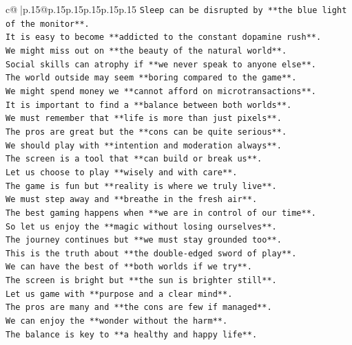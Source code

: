 \documentclass{article}
\begin{document}
{\begin{supertabular}{c@{$\;$}|p{.15\linewidth}@{}p{.15\linewidth}p{.15\linewidth}p{.15\linewidth}p{.15\linewidth}p{.15\linewidth}}
{{{\texttt{Sleep can be disrupted by **the blue light of the monitor**.} \\
\texttt{It is easy to become **addicted to the constant dopamine rush**.} \\
\texttt{We might miss out on **the beauty of the natural world**.} \\
\texttt{Social skills can atrophy if **we never speak to anyone else**.} \\
\texttt{The world outside may seem **boring compared to the game**.} \\
\texttt{We might spend money we **cannot afford on microtransactions**.} \\
\texttt{It is important to find a **balance between both worlds**.} \\
\texttt{We must remember that **life is more than just pixels**.} \\
\texttt{The pros are great but the **cons can be quite serious**.} \\
\texttt{We should play with **intention and moderation always**.} \\
\texttt{The screen is a tool that **can build or break us**.} \\
\texttt{Let us choose to play **wisely and with care**.} \\
\texttt{The game is fun but **reality is where we truly live**.} \\
\texttt{We must step away and **breathe in the fresh air**.} \\
\texttt{The best gaming happens when **we are in control of our time**.} \\
\texttt{So let us enjoy the **magic without losing ourselves**.} \\
\texttt{The journey continues but **we must stay grounded too**.} \\
\texttt{This is the truth about **the double{-}edged sword of play**.} \\
\texttt{We can have the best of **both worlds if we try**.} \\
\texttt{The screen is bright but **the sun is brighter still**.} \\
\texttt{Let us game with **purpose and a clear mind**.} \\
\texttt{The pros are many and **the cons are few if managed**.} \\
\texttt{We can enjoy the **wonder without the harm**.} \\
\texttt{The balance is key to **a healthy and happy life**.} \\
}}}
\end{supertabular}}
\end{document}

